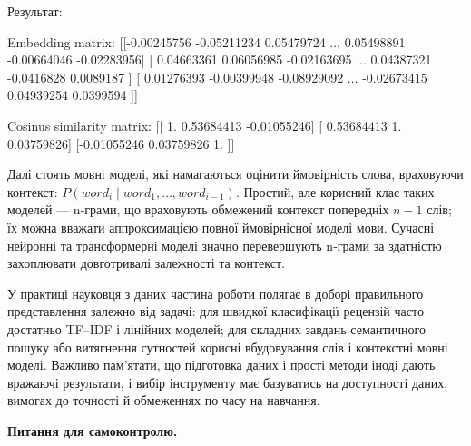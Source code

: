 Результат:

\begin{console}
Embedding matrix:
[[-0.00245756 -0.05211234  0.05479724 ...  0.05498891 -0.00664046
  -0.02283956]
 [ 0.04663361  0.06056985 -0.02163695 ...  0.04387321 -0.0416828
   0.0089187 ]
 [ 0.01276393 -0.00399948 -0.08929092 ... -0.02673415  0.04939254
   0.0399594 ]]

Cosinus similarity matrix:
[[ 1.          0.53684413 -0.01055246]
 [ 0.53684413  1.          0.03759826]
 [-0.01055246  0.03759826  1.        ]]
\end{console}


Далі стоять мовні моделі, які намагаються оцінити ймовірність слова, враховуючи контекст: $P(word_{i}\mid word_{1},\dots,word_{i-1})$. Простий, але корисний клас таких моделей — n‑грами, що враховують обмежений контекст попередніх $n-1$ слів; їх можна вважати аппроксимацією повної ймовірнісної моделі мови. Сучасні нейронні та трансформерні моделі значно перевершують n‑грами за здатністю захоплювати довготривалі залежності та контекст.

У практиці науковця з даних частина роботи полягає в доборі правильного представлення залежно від задачі: для швидкої класифікації рецензій часто достатньо TF–IDF і лінійних моделей; для складних завдань семантичного пошуку або витягнення сутностей корисні вбудовування слів і контекстні мовні моделі. Важливо пам'ятати, що підготовка даних і прості методи іноді дають вражаючі результати, і вибір інструменту має базуватись на доступності даних, вимогах до точності й обмеженнях по часу на навчання.



 \textbf{Питання для самоконтролю.}

